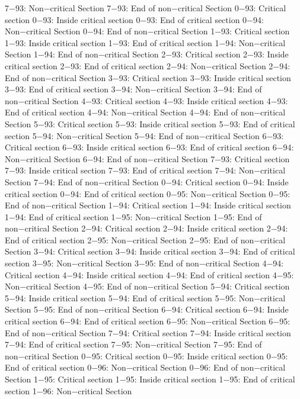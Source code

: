 7−93: Non−critical Section
7−93: End of non−critical Section
0−93: Critical section
0−93: Inside critical section
0−93: End of critical section
0−94: Non−critical Section
0−94: End of non−critical Section
1−93: Critical section
1−93: Inside critical section
1−93: End of critical section
1−94: Non−critical Section
1−94: End of non−critical Section
2−93: Critical section
2−93: Inside critical section
2−93: End of critical section
2−94: Non−critical Section
2−94: End of non−critical Section
3−93: Critical section
3−93: Inside critical section
3−93: End of critical section
3−94: Non−critical Section
3−94: End of non−critical Section
4−93: Critical section
4−93: Inside critical section
4−93: End of critical section
4−94: Non−critical Section
4−94: End of non−critical Section
5−93: Critical section
5−93: Inside critical section
5−93: End of critical section
5−94: Non−critical Section
5−94: End of non−critical Section
6−93: Critical section
6−93: Inside critical section
6−93: End of critical section
6−94: Non−critical Section
6−94: End of non−critical Section
7−93: Critical section
7−93: Inside critical section
7−93: End of critical section
7−94: Non−critical Section
7−94: End of non−critical Section
0−94: Critical section
0−94: Inside critical section
0−94: End of critical section
0−95: Non−critical Section
0−95: End of non−critical Section
1−94: Critical section
1−94: Inside critical section
1−94: End of critical section
1−95: Non−critical Section
1−95: End of non−critical Section
2−94: Critical section
2−94: Inside critical section
2−94: End of critical section
2−95: Non−critical Section
2−95: End of non−critical Section
3−94: Critical section
3−94: Inside critical section
3−94: End of critical section
3−95: Non−critical Section
3−95: End of non−critical Section
4−94: Critical section
4−94: Inside critical section
4−94: End of critical section
4−95: Non−critical Section
4−95: End of non−critical Section
5−94: Critical section
5−94: Inside critical section
5−94: End of critical section
5−95: Non−critical Section
5−95: End of non−critical Section
6−94: Critical section
6−94: Inside critical section
6−94: End of critical section
6−95: Non−critical Section
6−95: End of non−critical Section
7−94: Critical section
7−94: Inside critical section
7−94: End of critical section
7−95: Non−critical Section
7−95: End of non−critical Section
0−95: Critical section
0−95: Inside critical section
0−95: End of critical section
0−96: Non−critical Section
0−96: End of non−critical Section
1−95: Critical section
1−95: Inside critical section
1−95: End of critical section
1−96: Non−critical Section

